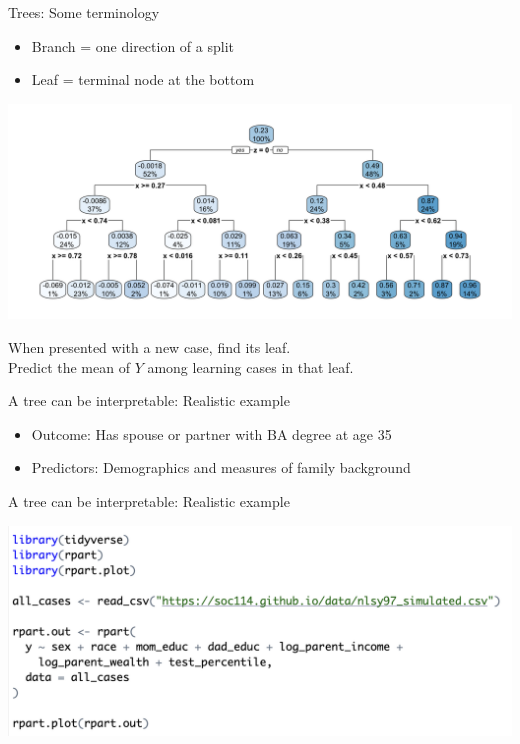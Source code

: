 \documentclass{beamer}
\begin{document}
\begin{frame}{Trees: Some terminology}

\begin{itemize}
\item Branch = one direction of a split
\item Leaf = terminal node at the bottom
\end{itemize}
\begin{center}
\includegraphics[width = .7\textwidth]{figures/tree_sim_viz}
\end{center}
When presented with a new case, find its leaf.\\Predict the mean of $Y$ among learning cases in that leaf.

\end{frame}

\begin{frame}{A tree can be interpretable: Realistic example}

\begin{itemize}
\item Outcome: Has spouse or partner with BA degree at age 35
\item Predictors: Demographics and measures of family background
\end{itemize}

\end{frame}

\begin{frame}{A tree can be interpretable: Realistic example}

\includegraphics[width = \textwidth]{figures/tree_fitting_code}

\end{frame}
\end{document}
